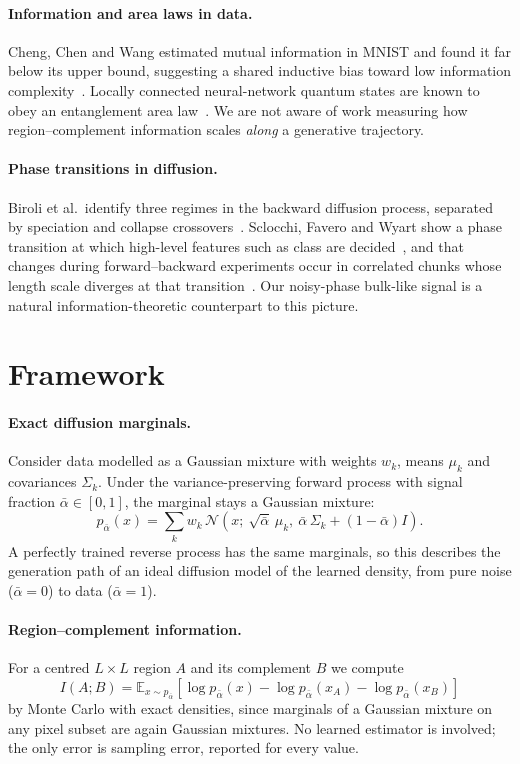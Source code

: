 \documentclass[10pt,twocolumn,a4paper]{article}
\newcommand{\ab}{\bar\alpha}
\begin{document}
\paragraph{Information and area laws in data.} Cheng, Chen and Wang estimated mutual information in MNIST and found it far below its upper bound, suggesting a shared inductive bias toward low information complexity~\cite{cheng}. Locally connected neural-network quantum states are known to obey an entanglement area law~\cite{arealawnn}. We are not aware of work measuring how region--complement information scales \emph{along} a generative trajectory.

\paragraph{Phase transitions in diffusion.} Biroli et al.\ identify three regimes in the backward diffusion process, separated by speciation and collapse crossovers~\cite{biroli}. Sclocchi, Favero and Wyart show a phase transition at which high-level features such as class are decided~\cite{sclocchi1}, and that changes during forward--backward experiments occur in correlated chunks whose length scale diverges at that transition~\cite{sclocchi2}. Our noisy-phase bulk-like signal is a natural information-theoretic counterpart to this picture.

\section{Framework}
\paragraph{Exact diffusion marginals.} Consider data modelled as a Gaussian mixture with weights $w_k$, means $\mu_k$ and covariances $\Sigma_k$. Under the variance-preserving forward process with signal fraction $\ab\in[0,1]$, the marginal stays a Gaussian mixture:
\begin{equation}
p_{\ab}(x)=\sum_k w_k\,\mathcal N\!\left(x;\ \sqrt{\ab}\,\mu_k,\ \ab\,\Sigma_k+(1-\ab)I\right).
\end{equation}
A perfectly trained reverse process has the same marginals, so this describes the generation path of an ideal diffusion model of the learned density, from pure noise ($\ab=0$) to data ($\ab=1$).

\paragraph{Region--complement information.} For a centred $L\times L$ region $A$ and its complement $B$ we compute
\begin{equation}
I(A;B)=\mathbb E_{x\sim p_{\ab}}\!\left[\log p_{\ab}(x)-\log p_{\ab}(x_A)-\log p_{\ab}(x_B)\right]
\end{equation}
by Monte Carlo with exact densities, since marginals of a Gaussian mixture on any pixel subset are again Gaussian mixtures. No learned estimator is involved; the only error is sampling error, reported for every value.
\end{document}
